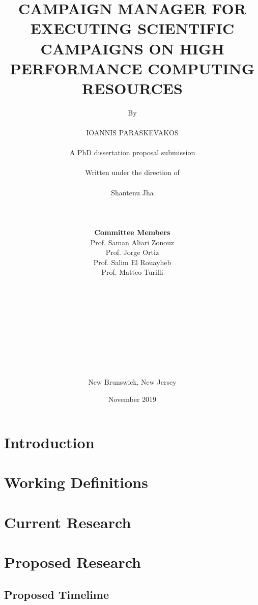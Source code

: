 

\title{CAMPAIGN MANAGER FOR EXECUTING SCIENTIFIC CAMPAIGNS ON HIGH PERFORMANCE COMPUTING RESOURCES}
\author{By\\\\IOANNIS PARASKEVAKOS\\\\A PhD dissertation proposal submission\\\\ Written under the direction of\\\\Shantenu Jha\\\\\\\\\textbf{Committee Members}\\Prof. Saman Aliari Zonouz\\Prof. Jorge Ortiz\\Prof. Salim El Rouayheb\\Prof. Matteo Turilli\\\\\\\\\\\\\\\\\\\\\\New Brunswick, New Jersey}
\date{November 2019}

\maketitle
\newpage
{}



\section{Introduction}


\section{Working Definitions}


\section{Current Research}


\section{Proposed Research}

\label{sec:proposed}

\subsection{Proposed Timelime}




